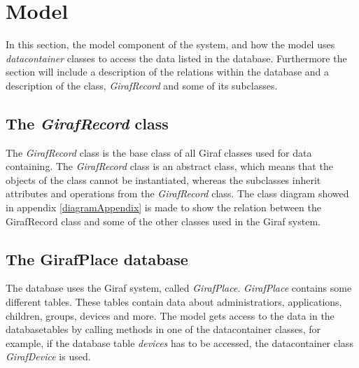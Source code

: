 \section{Model}
\label{model}

In this section, the model component of the system, and how the model uses \textit{datacontainer} classes to access the data listed in the database. Furthermore the section will include a description of the relations within the database and a description of the class, \textit{GirafRecord} and some of its subclasses.

\subsection{The \textit{GirafRecord} class}
The \textit{GirafRecord} class is the base class of all Giraf classes used for data containing. The \textit{GirafRecord} class is an abstract class, which means that the objects of the class cannot be instantiated, whereas the subclasses inherit attributes and operations from the \textit{GirafRecord} class. 
The class diagram showed in appendix \ref{diagramAppendix} is made to show the relation between the GirafRecord class and some of the other classes used in the Giraf system.

\subsection{The GirafPlace database}
The database uses the Giraf system, called \textit{GirafPlace}. \textit{GirafPlace} contains some different tables. These tables contain data about administratiors, applications, children, groups, devices and more.
The model gets access to the data in the databasetables by calling methods in one of the datacontainer classes, for example, if the database table \textit{devices} has to be accessed, the datacontainer class \textit{GirafDevice} is used.

